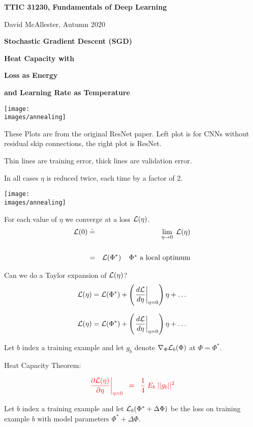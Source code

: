 




{\Huge
  \centerline{\bf TTIC 31230, Fundamentals of Deep Learning}
  \bigskip
  \centerline{David McAllester, Autumn 2020}
  \vfill
  \centerline{\bf Stochastic Gradient Descent (SGD)}
  \vfill
  \centerline{\bf Heat Capacity with}
  \vfill
  \centerline{\bf Loss as Energy}
  \vfill
  \centerline{\bf and Learning Rate as Temperature}
  \vfill
  \vfill
  \vfill


\centerline{\texttt{[image: \\images/annealing]}}

\vfill
These Plots are from the original ResNet paper.  Left plot is for CNNs without residual skip connections, the right plot is ResNet.

\vfill
Thin lines are training error, thick lines are validation error.

\vfill
In all cases $\eta$ is reduced twice, each time by a factor of 2.


\centerline{\texttt{[image: \\images/annealing]}}
For each value of $\eta$ we converge at a loss ${\cal L}(\eta)$.
\begin{eqnarray*}
{\cal L}(0) & \doteq & \lim_{\eta \rightarrow 0}\;{\cal L}(\eta) \\
\\
& = & {\cal L}(\Phi^*)\;\;\;\;\mbox{$\Phi^*$ a local optimum}
\end{eqnarray*}

\vfill
Can we do a Taylor expansion of ${\cal L}(\eta)$?
$${\cal L}(\eta) = {\cal L}(\Phi^*) + \left(\left.\frac{d{\cal L}}{d \eta}\right|_{\eta = 0}\right)\eta + \ldots$$


$${\cal L}(\eta) = {\cal L}(\Phi^*) + \left(\left.\frac{d{\cal L}}{d \eta}\right|_{\eta = 0}\right)\eta + \ldots$$

\vfill
Let $b$ index a training example and let $g_b$ denote $\nabla_\Phi {\cal L}_b(\Phi)$ at $\Phi = \Phi^*$.

\vfill
Heat Capacity Theorem:

\vfill
$${\color{red} \left.\frac{\partial {\cal L}(\eta)}{\partial \eta}\right|_{\eta = 0} \;\;=\;\; \frac{1}{4}\; E_b\; ||g_b||^2}$$


\vfill
Let $b$ index a training example and let ${\cal L}_b(\Phi^* + \Delta \Phi)$ be the loss on training example $b$
with model parameters $\Phi^* + \Delta\Phi$. 

}
